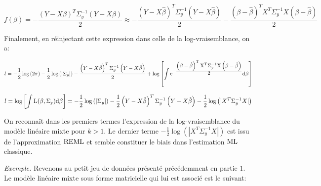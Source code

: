 $$
f(\beta)=-\frac{\displaystyle \left(Y-X\beta\right)^T\Sigma_y^{-1}\left(Y-X\beta\right)}{\displaystyle 2}\approx-\frac{\displaystyle \left(Y-X\hat{\beta}\right)^T\Sigma_y^{-1}\left(Y-X\hat{\beta}\right)}{\displaystyle 2}-\frac{\displaystyle \left(\beta-\hat{\beta}\right)^TX^T\Sigma_y^{-1}X\left(\beta-\hat{\beta}\right)}{\displaystyle 2}
$$

Finalement, en réinjectant cette expression dans celle de la log-vraisemblance, on a: 

$$l = -\frac{1}{2}\log{\left(2\pi\right)} - \frac{1}{2}\log{\left(\lvert\Sigma_y\rvert\right)}-\frac{\displaystyle \left(Y-X\hat{\beta}\right)^T\Sigma_y^{-1}\left(Y-X\hat{\beta}\right)}{\displaystyle 2}+\log\left[\int\rm{\large e}^{-\frac{\displaystyle \left(\beta-\hat{\beta}\right)^TX^T\Sigma_y^{-1}X\left(\beta-\hat{\beta}\right)}{\displaystyle 2}} d\beta \right]$$

$$l= \log\left[\int\rm{\large L}(\beta, \Sigma_y)d\beta\right] =- \frac{1}{2}\log{\left(\lvert\Sigma_y\rvert\right)}-\frac{1}{2}\displaystyle \left(Y-X\hat{\beta}\right)^T\Sigma_y^{-1}\left(Y-X\hat{\beta}\right)-\frac{1}{2}\log\left(|X^T\Sigma_y^{-1}X|\right)$$

On reconnaît dans les premiers termes l'expression de la log-vraisemblance du modèle linéaire mixte pour $k>1$. Le dernier terme $-\frac{1}{2}\log\left(|X^T\Sigma_y^{-1}X|\right)$ est issu de l'approximation $\rm{REML}$ et semble constituer le biais dans l'estimation $\rm{ML}$ classique.

\vspace{4mm}

\emph{Exemple.} Revenons au petit jeu de données présenté précédemment en partie $1$. Le modèle linéaire mixte sous forme matricielle qui lui est associé est le suivant: 

